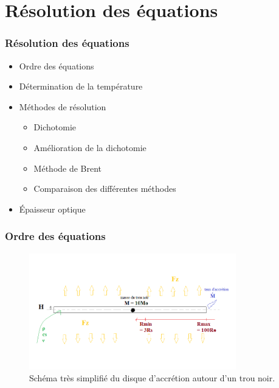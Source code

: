\documentclass[french]{beamer}
\begin{document}
\section{Résolution des équations}
\begin{frame}
\frametitle{Résolution des équations}

   \begin{itemize}
      \item Ordre des équations
      \item Détermination de la température
      \item Méthodes de résolution
         \begin{itemize} 
            \item Dichotomie
            \item Amélioration de la dichotomie
            \item Méthode de Brent
            \item Comparaison des différentes méthodes
         \end{itemize}
      \item Épaisseur optique
   \end{itemize}
\end{frame}


\begin{frame}
\frametitle{Ordre des équations}
      
   \begin{figure}[htb!]
      \includegraphics[width=9cm]{figures/bob_ross.png}
      \caption{Schéma très simplifié du disque d'accrétion autour d'un trou noir.}
   \end{figure}      
      \end{frame}
\end{document}

